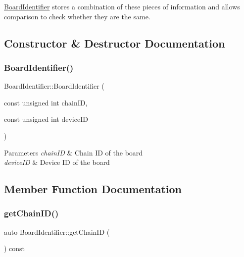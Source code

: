 \hyperlink{class_board_identifier}{Board\+Identifier} stores a combination of these pieces of information and allows comparison to check whether they are the same. 

\subsection{Constructor \& Destructor Documentation}
\mbox{\label{class_board_identifier_abfdd1f7aada13dbe08113942b8c033a1}} 
\subsubsection{\texorpdfstring{Board\+Identifier()}{BoardIdentifier()}}
{\footnotesize\ttfamily Board\+Identifier\+::\+Board\+Identifier (\begin{DoxyParamCaption}\item[{const unsigned int}]{chain\+ID,  }\item[{const unsigned int}]{device\+ID }\end{DoxyParamCaption})}


\begin{DoxyParams}{Parameters}
{\em chain\+ID} & Chain ID of the board \\
\hline
{\em device\+ID} & Device ID of the board \\
\hline
\end{DoxyParams}


\subsection{Member Function Documentation}
\mbox{\label{class_board_identifier_ad909f0c1eb9f80ec177ea8526c94d011}} 
\subsubsection{\texorpdfstring{get\+Chain\+I\+D()}{getChainID()}}
{\footnotesize\ttfamily auto Board\+Identifier\+::get\+Chain\+ID (\begin{DoxyParamCaption}{ }\end{DoxyParamCaption}) const\hspace{0.3cm}{\ttfamily [inline]}}



